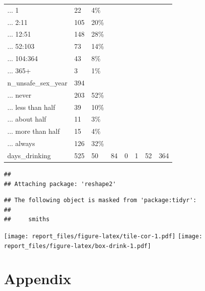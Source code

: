 \documentclass[
]{article}
\begin{document}
\begin{table}
\begin{tabular}[t]{llllllll}
... 1 & 22 & 4\% &  &  &  &  & \\
... 2:11 & 105 & 20\% &  &  &  &  & \\
... 12:51 & 148 & 28\% &  &  &  &  & \\
\addlinespace
... 52:103 & 73 & 14\% &  &  &  &  & \\
... 104:364 & 43 & 8\% &  &  &  &  & \\
... 365+ & 3 & 1\% &  &  &  &  & \\
n\_unsafe\_sex\_year & 394 &  &  &  &  &  & \\
... never & 203 & 52\% &  &  &  &  & \\
\addlinespace
... less than half & 39 & 10\% &  &  &  &  & \\
... about half & 11 & 3\% &  &  &  &  & \\
... more than half & 15 & 4\% &  &  &  &  & \\
... always & 126 & 32\% &  &  &  &  & \\
days\_drinking & 525 & 50 & 84 & 0 & 1 & 52 & 364\\
\bottomrule
\end{tabular}
\end{table}

\begin{verbatim}
## 
## Attaching package: 'reshape2'
\end{verbatim}

\begin{verbatim}
## The following object is masked from 'package:tidyr':
## 
##     smiths
\end{verbatim}

\texttt{[image: report\_files/figure-latex/tile-cor-1.pdf]}
\texttt{[image: report\_files/figure-latex/box-drink-1.pdf]}

\newpage

\hypertarget{apmissing}{%
\section{Appendix}\label{apmissing}}
\end{document}
